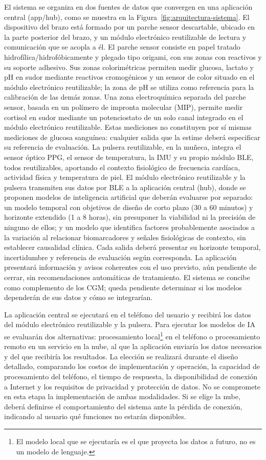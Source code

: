 El sistema se organiza en dos fuentes de datos que convergen en una aplicación central (app/hub), como se muestra en la Figura~\ref{fig:arquitectura-sistema}. El dispositivo del brazo está formado por un parche sensor descartable, ubicado en la parte posterior del brazo, y un módulo electrónico reutilizable de lectura y comunicación que se acopla a él. El parche sensor consiste en papel tratado hidrofílica/hidrofóbicamente y plegado tipo origami, con sus zonas con reactivos y su soporte adhesivo. Sus zonas colorimétricas permiten medir glucosa, lactato y pH en sudor mediante reactivos cromogénicos y un sensor de color situado en el módulo electrónico reutilizable; la zona de pH se utiliza como referencia para la calibración de las demás zonas. Una zona electroquímica separada del parche sensor, basada en un polímero de impronta molecular (MIP), permite medir cortisol en sudor mediante un potenciostato de un solo canal integrado en el módulo electrónico reutilizable. Estas mediciones no constituyen por sí mismas mediciones de glucosa sanguínea: cualquier salida que la estime deberá especificar su referencia de evaluación. La pulsera reutilizable, en la muñeca, integra el sensor óptico PPG, el sensor de temperatura, la IMU y su propio módulo BLE, todos reutilizables, aportando el contexto fisiológico de frecuencia cardíaca, actividad física y temperatura de piel. El módulo electrónico reutilizable y la pulsera transmiten sus datos por BLE a la aplicación central (hub), donde se proponen modelos de inteligencia artificial que deberán evaluarse por separado: un modelo temporal con objetivos de diseño de corto plazo (30 a 60 minutos) y horizonte extendido (1 a 8 horas), sin presuponer la viabilidad ni la precisión de ninguno de ellos; y un modelo que identifica factores probablemente asociados a la variación al relacionar biomarcadores y señales fisiológicas de contexto, sin establecer causalidad clínica. Cada salida deberá presentar su horizonte temporal, incertidumbre y referencia de evaluación según corresponda. La aplicación presentará información y avisos coherentes con el uso previsto, aún pendiente de cerrar, sin recomendaciones automáticas de tratamiento. El sistema se concibe como complemento de los CGM; queda pendiente determinar si los modelos dependerán de sus datos y cómo se integrarían.

La aplicación central se ejecutará en el teléfono del usuario y recibirá los datos del módulo electrónico reutilizable y la pulsera. Para ejecutar los modelos de IA se evaluarán dos alternativas: procesamiento local\footnote{El modelo local que se ejecutaría es el que proyecta los datos a futuro, no es un modelo de lenguaje.} en el teléfono o procesamiento remoto en un servicio en la nube, al que la aplicación enviaría los datos necesarios y del que recibiría los resultados. La elección se realizará durante el diseño detallado, comparando los costos de implementación y operación, la capacidad de procesamiento del teléfono, el tiempo de respuesta, la disponibilidad de conexión a Internet y los requisitos de privacidad y protección de datos. No se compromete en esta etapa la implementación de ambas modalidades. Si se elige la nube, deberá definirse el comportamiento del sistema ante la pérdida de conexión, indicando al usuario qué funciones no estarán disponibles.

